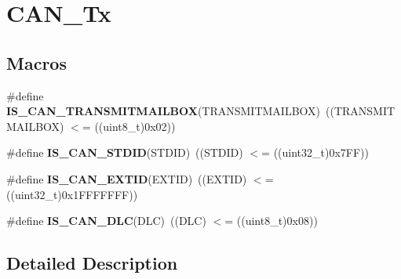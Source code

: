 \hypertarget{group___c_a_n___tx}{}\section{C\+A\+N\+\_\+\+Tx}
\label{group___c_a_n___tx}
\subsection*{Macros}
\begin{DoxyCompactItemize}
\item 
\hypertarget{group___c_a_n___tx_ga218b3e1380c4d49163c91a1af904e44c}{}\#define {\bfseries I\+S\+\_\+\+C\+A\+N\+\_\+\+T\+R\+A\+N\+S\+M\+I\+T\+M\+A\+I\+L\+B\+O\+X}(T\+R\+A\+N\+S\+M\+I\+T\+M\+A\+I\+L\+B\+O\+X)~((T\+R\+A\+N\+S\+M\+I\+T\+M\+A\+I\+L\+B\+O\+X) $<$= ((uint8\+\_\+t)0x02))\label{group___c_a_n___tx_ga218b3e1380c4d49163c91a1af904e44c}

\item 
\hypertarget{group___c_a_n___tx_gaf059e4383fa69dec6e18216b22a87f51}{}\#define {\bfseries I\+S\+\_\+\+C\+A\+N\+\_\+\+S\+T\+D\+I\+D}(S\+T\+D\+I\+D)~((S\+T\+D\+I\+D) $<$= ((uint32\+\_\+t)0x7\+F\+F))\label{group___c_a_n___tx_gaf059e4383fa69dec6e18216b22a87f51}

\item 
\hypertarget{group___c_a_n___tx_ga62dbc2163ad6751b3f921e717b00e9f2}{}\#define {\bfseries I\+S\+\_\+\+C\+A\+N\+\_\+\+E\+X\+T\+I\+D}(E\+X\+T\+I\+D)~((E\+X\+T\+I\+D) $<$= ((uint32\+\_\+t)0x1\+F\+F\+F\+F\+F\+F\+F))\label{group___c_a_n___tx_ga62dbc2163ad6751b3f921e717b00e9f2}

\item 
\hypertarget{group___c_a_n___tx_ga6109469a6a2792b3e7c6be520ea50d36}{}\#define {\bfseries I\+S\+\_\+\+C\+A\+N\+\_\+\+D\+L\+C}(D\+L\+C)~((D\+L\+C) $<$= ((uint8\+\_\+t)0x08))\label{group___c_a_n___tx_ga6109469a6a2792b3e7c6be520ea50d36}

\end{DoxyCompactItemize}


\subsection{Detailed Description}
